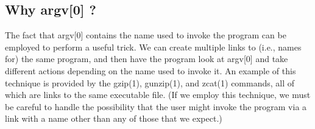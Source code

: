 \documentclass[
]{article}
\begin{document}
\hypertarget{why-argv0}{%
\subsection{Why argv{[}0{]} ?}\label{why-argv0}}

The fact that argv{[}0{]} contains the name used to invoke the program
can be employed to perform a useful trick. We can create multiple links
to (i.e., names for) the same program, and then have the program look at
argv{[}0{]} and take different actions depending on the name used to
invoke it. An example of this technique is provided by the gzip(1),
gunzip(1), and zcat(1) commands, all of which are links to the same
executable file. (If we employ this technique, we must be careful to
handle the possibility that the user might invoke the program via a link
with a name other than any of those that we expect.)
\end{document}
